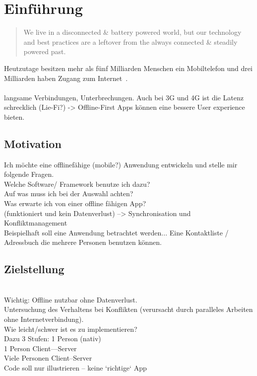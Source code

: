 \chapter{\label{chap:einleitung}Einführung}
\begin{quote}
	We live in a disconnected \& battery powered world, but our technology and best practices are a leftover from the always connected \& steadily powered past.
	\cite{offlinefirst}
\end{quote}

Heutzutage besitzen mehr als fünf Milliarden Menschen ein Mobiltelefon und drei Milliarden haben Zugang zum Internet~\cite{dev-report}.\\\\
langsame Verbindungen, Unterbrechungen. Auch bei 3G und 4G ist die Latenz schrecklich (Lie-Fi?) -> Offline-First Apps können eine bessere User experience bieten.

\section{Motivation}
Ich möchte eine offlinefähige (mobile?) Anwendung entwickeln und stelle mir folgende Fragen. \\
Welche Software/ Framework benutze ich dazu?\\
Auf was muss ich bei der Auswahl achten?\\
Was erwarte ich von einer offline fähigen App?\\
(funktioniert und kein Datenverlust) --> Synchronisation und Konfliktmanagement\\
Beispielhaft soll eine Anwendung betrachtet werden... Eine Kontaktliste / Adressbuch die mehrere Personen benutzen können.\\
\section{Zielstellung}
\\
Wichtig: Offline nutzbar ohne Datenverlust.\\
Untersuchung des Verhaltens bei  Konflikten (verursacht durch paralleles Arbeiten ohne Internetverbindung).\\
Wie leicht/schwer ist es zu implementieren?
\\
Dazu 3 Stufen: 1 Person (nativ)\\
1 Person Client---Server\\
Viele Personen Client--Server\\
Code soll nur illustrieren -- keine `richtige` App
